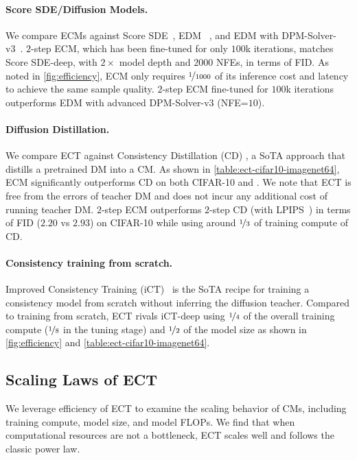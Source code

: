 \documentclass{article}
\begin{document}
\paragraph{Score SDE/Diffusion Models.}
% 
We compare ECMs against Score SDE~\citep{scoresde}, EDM ~\citep{Karras2022edm}, and EDM with DPM-Solver-v3~\citep{zheng2024dpm}. 
$2$-step ECM, which has been fine-tuned for only $100$k iterations, matches Score SDE-deep, with $2\times$ model depth and $2000$ NFEs, in terms of FID. 
As noted in \cref{fig:efficiency}, ECM only requires $\nicefrac{1}{1000}$ of its inference cost and latency to achieve the same sample quality.
$2$-step ECM fine-tuned for $100$k iterations outperforms EDM with advanced DPM-Solver-v3 (NFE=$10$). 

\paragraph{Diffusion Distillation.}
%
We compare ECT against Consistency Distillation (CD) \citep{cm}, a SoTA approach that distills a pretrained DM into a CM. As shown in \cref{table:ect-cifar10-imagenet64}, ECM significantly outperforms CD on both CIFAR-10 and \imgnet. We note that ECT is free from the errors of teacher DM and does not incur any additional cost of running teacher DM. 
$2$-step ECM outperforms $2$-step CD (with LPIPS~\citep{lpips}) in terms of FID ($2.20$ vs $2.93$) on CIFAR-10 while using around $\nicefrac{1}{3}$ of training compute of CD.
%
\paragraph{Consistency training from scratch.} Improved Consistency Training (iCT)~\citep{ict} is the SoTA recipe for training a consistency model from scratch without inferring the diffusion teacher. 
Compared to training from scratch, ECT rivals iCT-deep using $\nicefrac{1}{4}$ of the overall training compute ($\nicefrac{1}{8}$ in the tuning stage) and $\nicefrac{1}{2}$ of the model size as shown in \cref{fig:efficiency} and \cref{table:ect-cifar10-imagenet64}.




\subsection{Scaling Laws of ECT}
%
We leverage efficiency of ECT to examine the scaling behavior of CMs, including training compute, model size, and model FLOPs.
We find that when computational resources are not a bottleneck, ECT scales well and follows the classic power law.
%
\vspace{-5pt}
\end{document}

